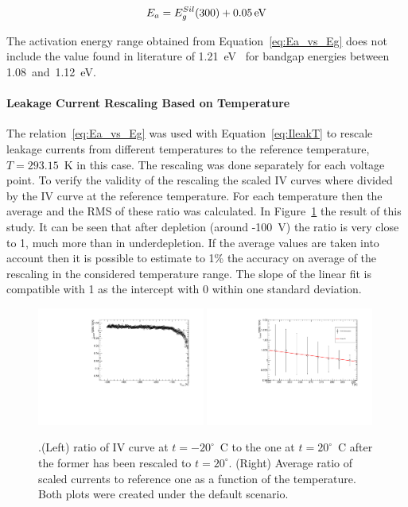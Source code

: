 \begin{equation}
E_a=E^{Sil}_g(300)+0.05\,{\rm eV}
\label{eq:Ea_vs_Eg}
\end{equation}

The activation energy range obtained from Equation~\ref{eq:Ea_vs_Eg} does not include 
the value found in literature of 1.21~eV~\cite{Chilingarov_tscale} for bandgap energies between 
1.08~and~1.12~eV.

\paragraph{Leakage Current Rescaling Based on Temperature}

The relation~\ref{eq:Ea_vs_Eg} was  used with Equation~\ref{eq:IleakT} to rescale 
leakage currents from different temperatures to the reference temperature, $T=293.15$~K 
in this case. The rescaling was done separately for each voltage point. 
 To verify the validity of the rescaling the scaled IV curves 
where divided by the IV curve at the reference temperature. For each 
temperature then the average and the RMS  of these ratio was calculated. 
In Figure~\ref{fig:scaling} the result of this study. It can be seen that after depletion (around -100~V) 
the ratio is very close to 1, much more than in underdepletion. 
If the average values are taken into account then it is possible to estimate to 1\% the accuracy 
on average of the rescaling in the considered temperature range. The slope of the linear fit 
is compatible with 1 as the intercept with 0 within one standard deviation.



\begin{figure}[!htbp]
\centering
\includegraphics[width=0.49\textwidth]{default/scaled_ratio_T-20.pdf}
\includegraphics[width=0.49\textwidth]{default/scaling.pdf}
\caption{\label{fig:scaling}.(Left) ratio of IV curve at $t=-20^{\circ}$~C to the one at $t=20^{\circ}$~C 
after the former has been rescaled to $t=20^{\circ}$. (Right) Average ratio of scaled currents to reference one as a function of the temperature. Both plots were created under the default scenario.}
\end{figure}

